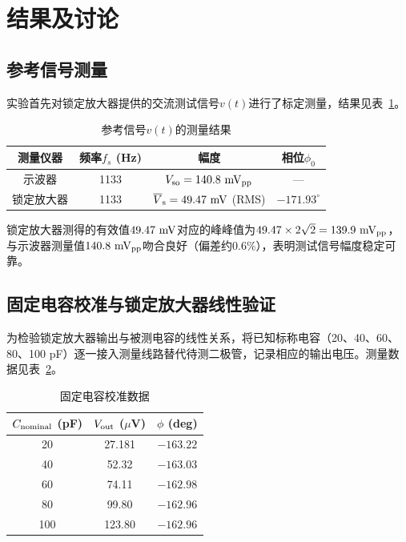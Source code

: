 \section{结果及讨论}

\subsection{参考信号测量}

实验首先对锁定放大器提供的交流测试信号$v(t)$进行了标定测量，结果见表~\ref{tab:reference}。

\begin{table}[H]
\centering
\caption{参考信号$v(t)$的测量结果}
\label{tab:reference}
\begin{ruledtabular}
\begin{tabular}{cccc}
\hline
\textbf{测量仪器} & \textbf{频率$f_s$ (Hz)} & \textbf{幅度} & \textbf{相位$\phi_0$} \\
\hline
示波器 & 1133 & $V_{\rm so} = 140.8\ {\rm mV_{pp}}$ & — \\
锁定放大器 & 1133 & $\overline{V}_{\rm s} = 49.47\ {\rm mV}$ (RMS) & $-171.93^\circ$ \\
\hline
\end{tabular}
\end{ruledtabular}
\end{table}

锁定放大器测得的有效值$49.47\ {\rm mV}$对应的峰峰值为$49.47 \times 2\sqrt{2} = 139.9\ {\rm mV_{pp}}$，与示波器测量值$140.8\ {\rm mV_{pp}}$吻合良好（偏差约$0.6\%$），表明测试信号幅度稳定可靠。

\subsection{固定电容校准与锁定放大器线性验证}

为检验锁定放大器输出与被测电容的线性关系，将已知标称电容（20、40、60、80、100 pF）逐一接入测量线路替代待测二极管，记录相应的输出电压。测量数据见表~\ref{tab:calibration}。

\begin{table}[H]
\centering
\caption{固定电容校准数据}
\label{tab:calibration}
\begin{ruledtabular}
\begin{tabular}{ccc}
\hline
$C_{\rm nominal}$ (pF) & $V_{\rm out}$ ($\mu$V) & $\phi$ (deg) \\
\hline
20 & 27.181 & $-163.22$ \\
40 & 52.32  & $-163.03$ \\
60 & 74.11  & $-162.98$ \\
80 & 99.80  & $-162.96$ \\
100 & 123.80 & $-162.96$ \\
\hline
\end{tabular}
\end{ruledtabular}
\end{table}


